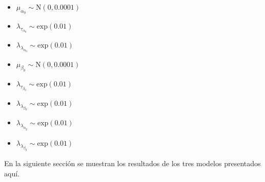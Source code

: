 \begin{multicols}{3}
	\begin{itemize}
		\item $\mu_{\alpha_0} \sim \mathrm{N}(0, 0.0001)$	
		\item $\lambda_{\tau_{\alpha_0}} \sim \mathrm{exp}(0.01)$	
		\item $\lambda_{\lambda_{\alpha_0}} \sim \mathrm{exp}(0.01)$	
		\item $\mu_{\beta_0} \sim \mathrm{N}(0, 0.0001)$	
		\item $\lambda_{\tau_{\beta_0}} \sim \mathrm{exp}(0.01)$	
		\item $\lambda_{\lambda_{\beta_0}} \sim \mathrm{exp}(0.01)$	
		\item $\lambda_{\lambda_{\alpha_y}} \sim \mathrm{exp}(0.01)$	
		\item $\lambda_{\lambda_{\beta_y}} \sim \mathrm{exp}(0.01)$	
	\end{itemize}
\end{multicols}


En la siguiente sección se muestran los resultados de los tres modelos presentados aquí.

